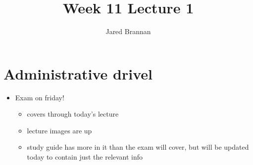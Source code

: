 \documentclass{article}
\title{Week 11 Lecture 1}
\author{Jared Brannan }
\theoremstyle{definition}
\begin{document}
\maketitle

\section{Administrative drivel}
\begin{itemize}
	\item Exam on friday!
		\begin{itemize}
			\item covers through today's lecture
			\item lecture images are up
			\item study guide has more in it than the exam will cover, but will be updated today to contain just the relevant info
		\end{itemize}
\end{itemize}
\end{document}
